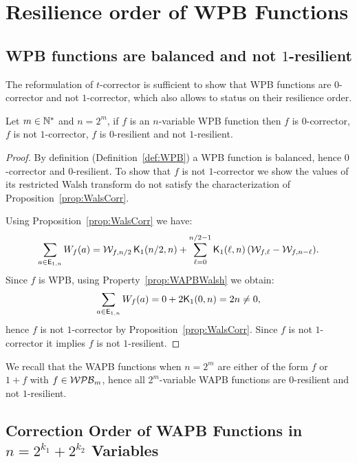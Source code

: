 \documentclass[11pt]{llncs}
\begin{document}
\section{Resilience order of WPB Functions}


\subsection{WPB functions are balanced and not $1$-resilient}
The reformulation of $t$-corrector is sufficient to show that WPB functions are $0$-corrector and not $1$-corrector, which also allows to status on their resilience order.

\begin{theorem}
	Let $m\in \mathbb{N}^*$ and $n=2^m$, if $f$ is an $n$-variable WPB function then $f$ is $0$-corrector, $f$ is not $1$-corrector, $f$ is $0$-resilient and not $1$-resilient.
\end{theorem}
\begin{proof}
	By definition (Definition~\ref{def:WPB}) a WPB function is balanced, hence $0$-corrector and $0$-resilient.
	To show that $f$ is not $1$-corrector we show the values of its restricted Walsh transform do not satisfy the characterization of Proposition~\ref{prop:WalsCorr}.

	Using Proposition~\ref{prop:WalsCorr} we have:
	\[\sum_{a\in \mathsf{E}_{1,n}} W_{f}(a)=\mathcal{W}_{f,n/2} \, \mathsf{K}_{1}(n/2,n)+ \sum_{\ell=0}^{n/2-1} \mathsf{K}_{1}(\ell,n) \, ( \mathcal{W}_{f,\ell} - \mathcal{W}_{f,n-\ell}).\]
	Since $f$ is WPB, using Property~\ref{prop:WAPBWalsh} we obtain:
	\[\sum_{a\in \mathsf{E}_{1,n}} W_{f}(a)=0+2\mathsf{K}_{1}(0,n)=2n\ne 0,\]
	hence $f$ is not $1$-corrector by Proposition~\ref{prop:WalsCorr}. Since $f$ is not $1$-corrector it implies $f$ is not $1$-resilient.

\end{proof}

We recall that the WAPB functions when $n=2^m$ are either of the form $f$ or $1+f$ with $f\in \mathcal{WPB}_{m}$, hence all $2^m$-variable WAPB functions are $0$-resilient and not $1$-resilient.



\subsection{Correction Order of WAPB Functions in $n=2^{k_1} + 2^{k_2}$ Variables}
\end{document}
